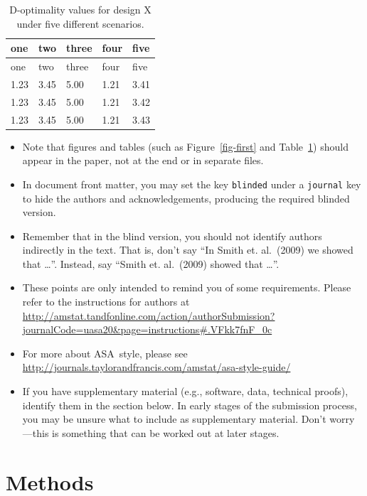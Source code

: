 \documentclass[
  12pt]{article}
\providecommand{\tightlist}{%
  \setlength{\itemsep}{0pt}\setlength{\parskip}{0pt}}\usepackage{longtable,booktabs,array}
\begin{document}
\hypertarget{tbl-one}{}
\begin{longtable}[]{@{}lllll@{}}
\caption{\label{tbl-one}D-optimality values for design X under five
different scenarios.}\tabularnewline
\toprule()
one & two & three & four & five \\
\midrule()
\endfirsthead
\toprule()
one & two & three & four & five \\
\midrule()
\endhead
1.23 & 3.45 & 5.00 & 1.21 & 3.41 \\
1.23 & 3.45 & 5.00 & 1.21 & 3.42 \\
1.23 & 3.45 & 5.00 & 1.21 & 3.43 \\
\bottomrule()
\end{longtable}

\begin{itemize}
\tightlist
\item
  Note that figures and tables (such as Figure~\ref{fig-first} and
  Table~\ref{tbl-one}) should appear in the paper, not at the end or in
  separate files.
\item
  In document front matter, you may set the key \texttt{blinded} under a
  \texttt{journal} key to hide the authors and acknowledgements,
  producing the required blinded version.
\item
  Remember that in the blind version, you should not identify authors
  indirectly in the text. That is, don't say ``In Smith et. al.~(2009)
  we showed that \ldots{}''. Instead, say ``Smith et. al.~(2009) showed
  that \ldots{}''.
\item
  These points are only intended to remind you of some requirements.
  Please refer to the instructions for authors at
  \url{http://amstat.tandfonline.com/action/authorSubmission?journalCode=uasa20\&page=instructions\#.VFkk7fnF_0c}
\item
  For more about ASA~style, please see
  \url{http://journals.taylorandfrancis.com/amstat/asa-style-guide/}
\item
  If you have supplementary material (e.g., software, data, technical
  proofs), identify them in the section below. In early stages of the
  submission process, you may be unsure what to include as supplementary
  material. Don't worry---this is something that can be worked out at
  later stages.
\end{itemize}

\hypertarget{sec-meth}{%
\section{Methods}\label{sec-meth}}
\end{document}

